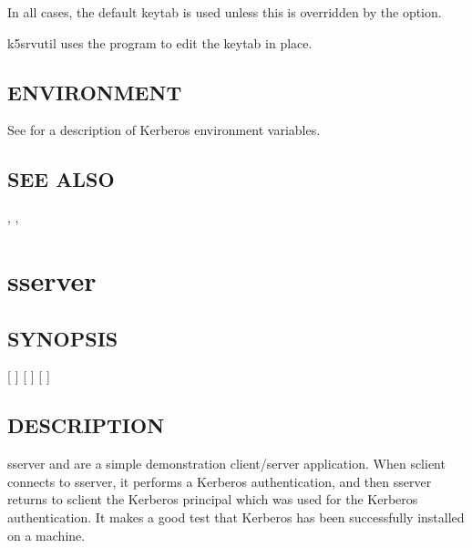 \documentclass[letterpaper,10pt,english]{sphinxmanual}
\begin{document}
In all cases, the default keytab is used unless this is overridden by
the  option.

k5srvutil uses the {\hyperref[\detokenize{admin/admin_commands/kadmin_local:kadmin-1}]{}} program to edit the keytab in
place.


\subsection{ENVIRONMENT}
\label{\detokenize{admin/admin_commands/k5srvutil:environment}}
See  for a description of Kerberos environment
variables.


\subsection{SEE ALSO}
\label{\detokenize{admin/admin_commands/k5srvutil:see-also}}
{\hyperref[\detokenize{admin/admin_commands/kadmin_local:kadmin-1}]{}}, {\hyperref[\detokenize{admin/admin_commands/ktutil:ktutil-1}]{}}, 


\section{sserver}
\label{\detokenize{admin/admin_commands/sserver:sserver-8}}\label{\detokenize{admin/admin_commands/sserver::doc}}\label{\detokenize{admin/admin_commands/sserver:sserver}}

\subsection{SYNOPSIS}
\label{\detokenize{admin/admin_commands/sserver:synopsis}}
{[}   {]}
{[}   {]}
{[}  {]}


\subsection{DESCRIPTION}
\label{\detokenize{admin/admin_commands/sserver:description}}
sserver and  are a simple demonstration client/server
application.  When sclient connects to sserver, it performs a Kerberos
authentication, and then sserver returns to sclient the Kerberos
principal which was used for the Kerberos authentication.  It makes a
good test that Kerberos has been successfully installed on a machine.
\end{document}
